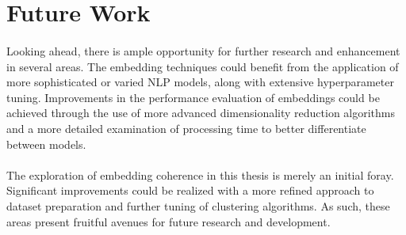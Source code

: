 \section{Future Work}

\paragraph{}Looking ahead, there is ample opportunity for further research and enhancement in several areas. The embedding techniques could benefit from the application of more sophisticated or varied NLP models, along with extensive hyperparameter tuning. Improvements in the performance evaluation of embeddings could be achieved through the use of more advanced dimensionality reduction algorithms and a more detailed examination of processing time to better differentiate between models.

\paragraph{}The exploration of embedding coherence in this thesis is merely an initial foray. Significant improvements could be realized with a more refined approach to dataset preparation and further tuning of clustering algorithms. As such, these areas present fruitful avenues for future research and development.


